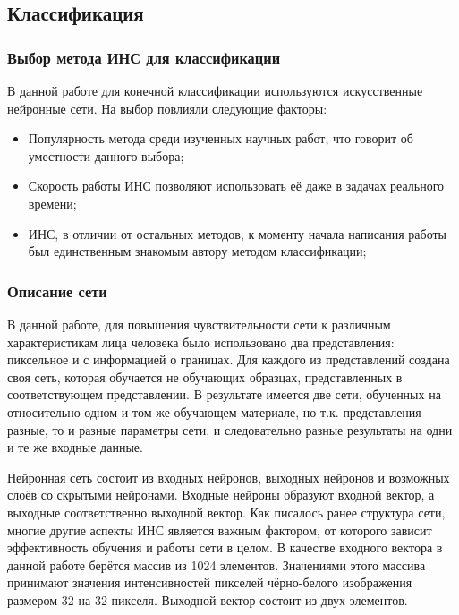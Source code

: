 \documentclass[12pt]{report}
\newenvironment{myItemize}{
 	\vspace{-10pt}
	\begin{itemize}[nolistsep]
}{\end{itemize}}
\begin{document}

\subsection{Классификация}

\subsubsection{Выбор метода ИНС для классификации}
В данной работе для конечной классификации используются искусственные нейронные сети. На выбор повлияли следующие 
факторы:
\begin{myItemize}
\item Популярность метода среди изученных научных работ, что говорит об уместности данного выбора;
\item Скорость работы ИНС позволяют использовать её даже в задачах реального времени;
\item ИНС, в отличии от остальных методов, к моменту начала написания работы был единственным знакомым автору 
методом 
классификации;
\end{myItemize}



\subsubsection{Описание сети}
В данной работе, для повышения чувствительности сети к различным характеристикам лица человека было использовано 
два 
представления: пиксельное и с информацией о границах. Для каждого из представлений создана своя сеть, которая 
обучается не обучающих образцах, представленных в соответствующем представлении. В результате имеется две сети, 
обученных на относительно одном и том же обучающем материале, но т.к. представления разные, то и разные параметры 
сети, и следовательно разные результаты на одни и те же входные данные.

Нейронная сеть состоит из входных нейронов, выходных нейронов и возможных слоёв со скрытыми нейронами. Входные 
нейроны образуют входной вектор, а выходные соответственно выходной вектор. Как писалось ранее структура сети, 
многие 
другие аспекты ИНС является важным фактором, от которого зависит эффективность обучения и работы сети в целом. В 
качестве входного вектора в данной работе берётся массив из 1024 элементов. Значениями этого массива принимают 
значения интенсивностей пикселей чёрно-белого изображения размером 32 на 32 пикселя. Выходной вектор состоит из 
двух 
элементов. 
\end{document}
